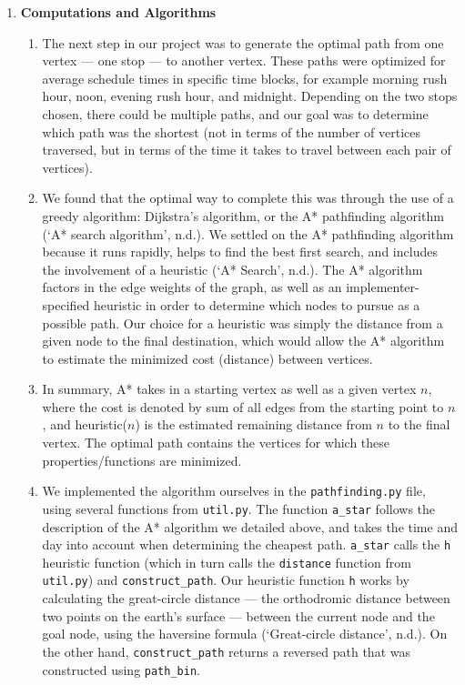 \documentclass[fontsize=11pt]{article}
\begin{document}
\begin{enumerate}
        \item \textbf{Computations and Algorithms}
        \begin{enumerate}
            \item The next step in our project was to generate the optimal path from one vertex — one stop — to another vertex. These paths were optimized for average schedule times in specific time blocks, for example morning rush hour, noon, evening rush hour, and midnight. Depending on the two stops chosen, there could be multiple paths, and our goal was to determine which path was the shortest (not in terms of the number of vertices traversed, but in terms of the time it takes to travel between each pair of vertices). \\

            \item We found that the optimal way to complete this was through the use of a greedy algorithm: Dijkstra's algorithm, or the A* pathfinding algorithm (`A* search algorithm', n.d.). We settled on the A* pathfinding algorithm because it runs rapidly, helps to find the best first search, and includes the involvement of a heuristic (`A* Search', n.d.). The A* algorithm factors in the edge weights of the graph, as well as an implementer-specified heuristic in order to determine which nodes to pursue as a possible path. Our choice for a heuristic was simply the distance from a given node to the final destination, which would allow the A* algorithm to estimate the minimized cost (distance) between vertices. \\

            \item In summary, A* takes in a starting vertex as well as a given vertex $n$, where the cost is denoted by sum of all edges from the starting point to $n$, and heuristic($n$) is the estimated remaining distance from $n$ to the final vertex. The optimal path contains the vertices for which these properties/functions are minimized. \\

            \item We implemented the algorithm ourselves in the \texttt{pathfinding.py} file, using several functions from \texttt{util.py}. The function \texttt{a\_star} follows the description of the A* algorithm we detailed above, and takes the time and day into account when determining the cheapest path. \texttt{a\_star} calls the \texttt{h} heuristic function (which in turn calls the \texttt{distance} function from \texttt{util.py}) and \texttt{construct\_path}. Our heuristic function \texttt{h} works by calculating the great-circle distance — the orthodromic distance between two points on the earth's surface — between the current node and the goal node, using the haversine formula (`Great-circle distance', n.d.). On the other hand, \texttt{construct\_path} returns a reversed path that was constructed using \texttt{path\_bin}. \\


\end{enumerate}
\end{enumerate}
\end{document}
